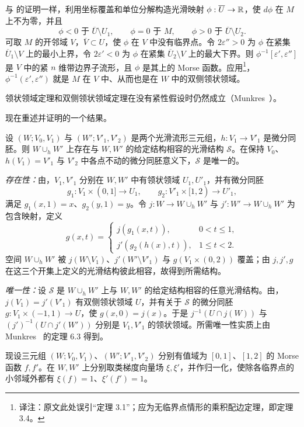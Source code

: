 与 的证明一样，利用坐标覆盖和单位分解构造光滑映射 $\phi:\overline U\to\mathbb{R}$，使 $d\phi$ 在 $M$ 上不为零，并且
\[
  \phi<0\text{ 于 }\overline U\setminus U_1,\qquad
  \phi=0\text{ 于 }M,\qquad
  \phi>0\text{ 于 }\overline U\setminus U_2.
\]
可取 $M$ 的开邻域 $V$，$\overline V\subset U$，使 $\phi$ 在 $V$ 中没有临界点。令 $2\varepsilon''>0$ 为 $\phi$ 在紧集 $\overline U_1\setminus V$ 上的最小上界，令 $2\varepsilon'<0$ 为 $\phi$ 在紧集 $\overline U_2\setminus V$ 上的最大下界。则 $\phi^{-1}[\varepsilon',\varepsilon'']$ 是 $V$ 中的紧 $n$ 维带边界子流形，且 $\phi$ 是其上的 Morse 函数。应用\footnote{译注：原文此处误引“定理 3.1”；应为无临界点情形的乘积配边定理，即定理 3.4。}，$\phi^{-1}(\varepsilon',\varepsilon'')$ 就是 $M$ 在 $V$ 中、从而也是在 $W$ 中的双侧领状领域。
\EndProof

\Remark 领状领域定理和双侧领状领域定理在没有紧性假设时仍然成立（Munkres~\cite[p.~51]{ref05}）。

现在重述并证明的一个结果。

\label{thm:1.4-restated}设 $(W;V_0,V_1)$ 与 $(W';V'_1,V'_2)$ 是两个光滑流形三元组，$h:V_1\to V'_1$ 是微分同胚。则 $W\cup_hW'$ 上存在与 $W,W'$ 的给定结构相容的光滑结构 $\mathcal S$。在保持 $V_0$、$h(V_1)=V'_1$ 与 $V'_2$ 中各点不动的微分同胚意义下，$\mathcal S$ 是唯一的。

\Proof \textit{存在性：}由，$V_1,V'_1$ 分别在 $W,W'$ 中有领状领域 $U_1,U'_1$，并有微分同胚
\[
 g_1:V_1\times(0,1]\to U_1,\qquad
 g_2:V'_1\times[1,2)\to U'_1,
\]
满足 $g_1(x,1)=x$、$g_2(y,1)=y$。令 $j:W\to W\cup_hW'$ 与 $j':W'\to W\cup_hW'$ 为包含映射，定义
\[
g(x,t)=
\begin{cases}
 j(g_1(x,t)),&0<t\leq1,\\
 j'(g_2(h(x),t)),&1\leq t<2.
\end{cases}
\]
空间 $W\cup_hW'$ 被 $j(W\setminus V_1)$、$j'(W'\setminus V'_1)$ 与 $g(V_1\times(0,2))$ 覆盖；由 $j,j',g$ 在这三个开集上定义的光滑结构彼此相容，故得到所需结构。

\textit{唯一性：}设 $\mathcal S$ 是 $W\cup_hW'$ 上与 $W,W'$ 的给定结构相容的任意光滑结构。由，$j(V_1)=j'(V'_1)$ 有双侧领状领域 $U$，并有关于 $\mathcal S$ 的微分同胚 $g:V_1\times(-1,1)\to U$，使 $g(x,0)=j(x)$。于是 $j^{-1}(U\cap j(W))$ 与 $(j')^{-1}(U\cap j'(W'))$ 分别是 $V_1,V'_1$ 的领状领域。所需唯一性实质上由 Munkres~\cite[p.~62]{ref05} 的定理 6.3 得到。
\EndProof

现设三元组 $(W;V_0,V_1)$、$(W';V'_1,V'_2)$ 分别有值域为 $[0,1]$、$[1,2]$ 的 Morse 函数 $f,f'$。在 $W,W'$ 上分别取类梯度向量场 $\xi,\xi'$，并作归一化，使除各临界点的小邻域外都有 $\xi(f)=1$、$\xi'(f')=1$。

